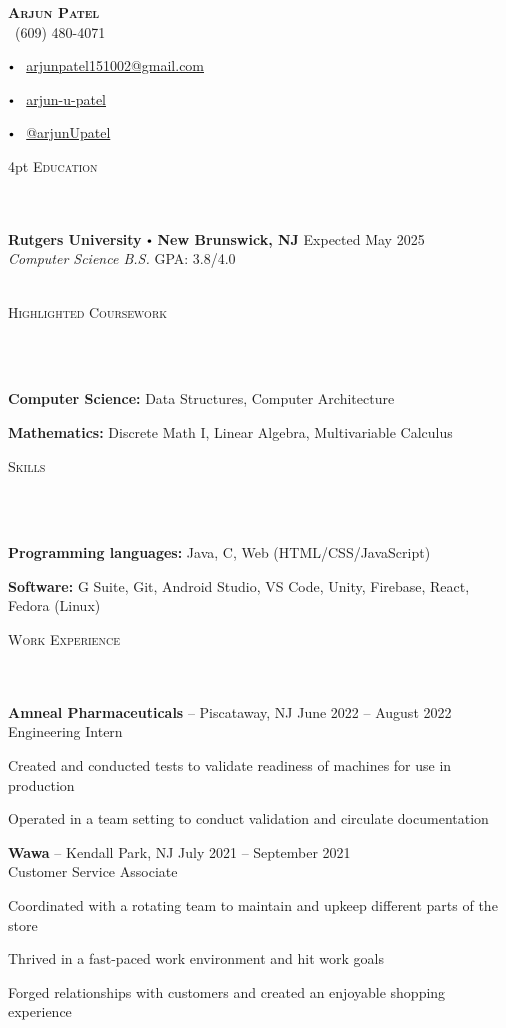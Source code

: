\documentclass{article}
\newcommand{\contact}[3]{
\vspace*{3pt}
\begin{center}
{\LARGE \scshape {#1}}\\
\vspace{5pt}
#2 
\vspace{2pt}
#3
\end{center}
\vspace*{-8pt}
}
\newcommand{\header}[1]{{
\hspace*{0pt}\vspace*{6pt} \textsc{#1}} \vspace*{-6pt} 
\lineunder
}
\newcommand{\lineunder}{
\vspace*{-8pt} \\ \hspace*{-3pt} 
\hrulefill \\
}
\newcommand{\college}[7]{
\textbf{#1} \labelitemi \textbf{#2} \hfill #3 \\ #4 \hfill #7 \\ #5 \\ #6 \vspace*{5pt}
}
\newcommand{\employer}[4]{{
\vspace*{2pt}%
\textbf{#1} #2 \hfill #3\\ #4 \vspace*{2pt}}
}
\renewcommand{\labelitemi}{
$\vcenter{\hbox{\tiny$\bullet$}}$\hspace*{3pt}
}
\renewcommand{\labelitemii}{
$\vcenter{\hbox{\tiny$\bullet$}}$\hspace*{-3pt}
}
\newenvironment{bullet-list-major}{
\begin{list}{\labelitemii}{\setlength\leftmargin{9pt} 
\topsep 0pt \itemsep -2pt}}{\vspace*{4pt}\end{list}
}
\newenvironment{bullet-list-minor}{
\begin{list}{\labelitemii}{\setlength\leftmargin{15pt} 
\topsep 0pt \itemsep -2pt}}{\vspace*{4pt}\end{list}
}
\begin{document}
\small
\smallskip
\vspace*{-20pt}

\contact{\textbf{Arjun Patel}}
{\faPhone\ (609) 480-4071
\labelitemi \faEnvelope\ \href{mailto:arjunpatel151002@gmail.com}{arjunpatel151002@gmail.com}
\labelitemi \faLinkedin\ \href{https://www.linkedin.com/in/arjun-u-patel/}{arjun-u-patel}
\labelitemi \faGithub\ \href{https://github.com/arjunupatel}{@arjunUpatel}%
}

\vspace{4pt}
\header{Education}
    \college{Rutgers University}{New Brunswick, NJ}{Expected May 2025}
    {\textit{Computer Science B.S.}}
    {}{}{GPA: 3.8/4.0}
    
\vspace*{4pt}%
\header{Highlighted Coursework}
    \begin{bullet-list-major}
    \item \textbf{Computer Science:} Data Structures, Computer Architecture
    \item \textbf{Mathematics:} Discrete Math I, Linear Algebra, Multivariable Calculus
    \end{bullet-list-major}

\vspace*{4pt}%
\header{Skills}
    \begin{bullet-list-major}
    \item \textbf{Programming languages:} Java, C, Web (HTML/CSS/JavaScript)
    \item \textbf{Software:} G Suite, Git, Android Studio, VS Code, Unity, Firebase, React, Fedora (Linux)
    \end{bullet-list-major}
    
\vspace*{4pt}%
\header{Work Experience}

    \employer{Amneal Pharmaceuticals}
    {-- Piscataway, NJ}{June 2022 -- August 2022}{Engineering Intern}
	\begin{bullet-list-minor}
    \item Created and conducted tests to validate readiness of machines for use in production
    \item Operated in a team setting to conduct validation and circulate documentation
    \end{bullet-list-minor}
    
    \employer{Wawa}
    {-- Kendall Park, NJ}{July 2021 -- September 2021}{Customer Service Associate}
	\begin{bullet-list-minor}
	\item Coordinated with a rotating team to maintain and upkeep different parts of the store
    \item Thrived in a fast-paced work environment and hit work goals
    \item Forged relationships with customers and created an enjoyable shopping experience
    \end{bullet-list-minor}
    
\end{document}
